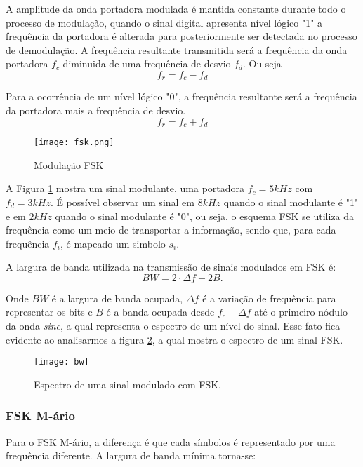 A amplitude da onda portadora modulada é mantida constante durante todo o processo de modulação, quando o sinal digital apresenta nível lógico "1" a frequência da portadora é alterada para posteriormente ser detectada no processo de demodulação.
A frequência resultante transmitida será a frequência da onda portadora $f_c$ diminuida de uma frequência de desvio $f_d$.
Ou seja
\begin{equation}
f_r = f_c - f_d
\end{equation}

Para a ocorrência de um nível lógico "0", a frequência resultante será a frequência da portadora mais a frequência de desvio.
\begin{equation}
f_r = f_c + f_d
\end{equation}

\begin{figure}[H]
    \centering
    \texttt{[image: fsk.png]}
    \caption{Modulação FSK}
    \label{fig:mdfsk}
\end{figure}

A Figura \ref{fig:mdfsk} mostra um sinal modulante, uma portadora $f_c=5kHz$ com $f_d = 3kHz$.
É possível observar um sinal em $8kHz$ quando o sinal modulante é "1" e em $2kHz$ quando o sinal modulante é "0", ou seja, o esquema FSK se utiliza da frequência como um meio de transportar a informação, sendo que, para cada frequência $f_i$, é mapeado um simbolo $s_i$.

A largura de banda utilizada na transmissão de sinais modulados em FSK é:
\[
BW = 2\cdot \Delta f +2B.
\]

Onde $BW$ é a largura de banda ocupada, $\Delta f$ é a variação de frequência para representar os bits e $B$ é a banda ocupada desde  $f_c + \Delta f$ até o primeiro nódulo da onda \textit{sinc}, a qual representa o espectro de um nível do sinal. 
Esse fato fica evidente ao analisarmos a figura \ref{fig:bw}, a qual mostra o espectro de um sinal FSK.

\begin{figure}[H]
    \centering
    \texttt{[image: bw]}
    \caption{Espectro de uma sinal modulado com FSK.}
    \label{fig:bw}
\end{figure}

\subsubsection{FSK M-ário}
Para o FSK M-ário, a diferença é que cada símbolos é representado por uma frequência diferente. A largura de banda mínima torna-se:


